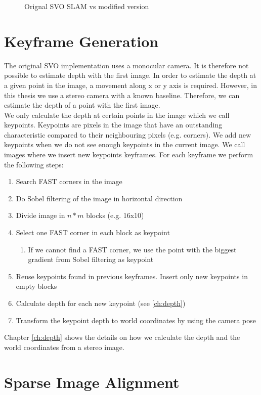 \documentclass[11pt,a4paper,titlepage,oneside]{report}
\begin{document}
\begin{figure}[H]
  \caption{Orignal SVO SLAM vs modified version}\label{fig:svo_slam}
\end{figure}

\section{Keyframe Generation}\label{sec:initialization}
The original SVO implementation uses a monocular camera. It is therefore not possible to estimate depth with the first image. In order to estimate the depth at a given point in the image, a movement along x or y axis is required. However, in this thesis we use a stereo camera with a known baseline. Therefore, we can estimate the depth of a point with the first image.\\
We only calculate the depth at certain points in the image which we call keypoints. Keypoints are pixels in the image that have an outstanding characteristic compared to their neighbouring pixels (e.g. corners). We add new keypoints when we do not see enough keypoints in the current image. We call images where we insert new keypoints keyframes. For each keyframe we perform the following steps:
\begin{enumerate}
  \item{Search FAST corners in the image \cite{fast}}
  \item{Do Sobel filtering of the image in horizontal direction}
  \item{Divide image in $n*m$ blocks (e.g. 16x10)}
  \item{Select one FAST corner in each block as keypoint}
    \begin{enumerate}
      \item{If we cannot find a FAST corner, we use the point with the biggest gradient from Sobel filtering as keypoint}
    \end{enumerate}
  \item{Reuse keypoints found in previous keyframes. Insert only new keypoints in empty blocks}
  \item{Calculate depth for each new keypoint (see \ref{ch:depth})}
  \item{Transform the keypoint depth to world coordinates by using the camera pose}
\end{enumerate}

Chapter \ref{ch:depth} shows the details on how we calculate the depth and the world coordinates from a stereo image.

\section{Sparse Image Alignment}\label{sec:sia}
\end{document}
